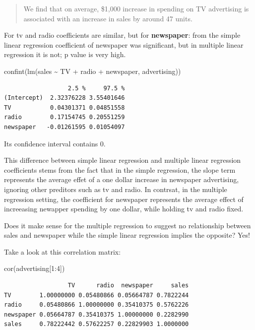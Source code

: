 \documentclass[
  letterpaper,
  DIV=11,
  numbers=noendperiod]{scrreprt}
\newenvironment{Shaded}{\begin{snugshade}}{\end{snugshade}}
\newcommand{\DecValTok}[1]{\textcolor[rgb]{0.47,0.16,0.63}{#1}}
\newcommand{\FunctionTok}[1]{\textcolor[rgb]{0.02,0.16,0.49}{#1}}
\newcommand{\NormalTok}[1]{\textcolor[rgb]{0.33,0.33,0.33}{#1}}
\newcommand{\SpecialCharTok}[1]{\textcolor[rgb]{0.00,0.46,0.62}{#1}}
\begin{document}
\begin{quote}
We find that on average, \$1,000 increase in spending on TV advertising
is associated with an increase in sales by around 47 units.
\end{quote}

For tv and radio coefficients are similar, but for \textbf{newspaper}:
from the simple linear regression coefficient of newspaper was
significant, but in multiple linear regression it is not; p value is
very high.

\begin{Shaded}
\begin{Highlighting}[]
\FunctionTok{confint}\NormalTok{(}\FunctionTok{lm}\NormalTok{(sales }\SpecialCharTok{\textasciitilde{}}\NormalTok{ TV }\SpecialCharTok{+}\NormalTok{ radio }\SpecialCharTok{+}\NormalTok{ newspaper, advertising))}
\end{Highlighting}
\end{Shaded}

\begin{verbatim}
                  2.5 %     97.5 %
(Intercept)  2.32376228 3.55401646
TV           0.04301371 0.04851558
radio        0.17154745 0.20551259
newspaper   -0.01261595 0.01054097
\end{verbatim}

Its confidence interval contains 0.

This difference between simple linear regression and multiple linear
regression coefficients stems from the fact that in the simple
regression, the slope term represents the average effet of a one dollar
increase in newspaper advertising, ignoring other preditors such as tv
and radio. In contrsat, in the multiple regression setting, the
coefficient for newspaper represents the average effect of increeasing
newapper spending by one dollar, while holding tv and radio fixed.

Does it make sense for the multiple regression to suggest no
relationship between sales and newspaper while the simple linear
regression implies the opposite? Yes!

Take a look at this correlation matrix:

\begin{Shaded}
\begin{Highlighting}[]
\FunctionTok{cor}\NormalTok{(advertising[}\DecValTok{1}\SpecialCharTok{:}\DecValTok{4}\NormalTok{])}
\end{Highlighting}
\end{Shaded}

\begin{verbatim}
                  TV      radio  newspaper     sales
TV        1.00000000 0.05480866 0.05664787 0.7822244
radio     0.05480866 1.00000000 0.35410375 0.5762226
newspaper 0.05664787 0.35410375 1.00000000 0.2282990
sales     0.78222442 0.57622257 0.22829903 1.0000000
\end{verbatim}
\end{document}
